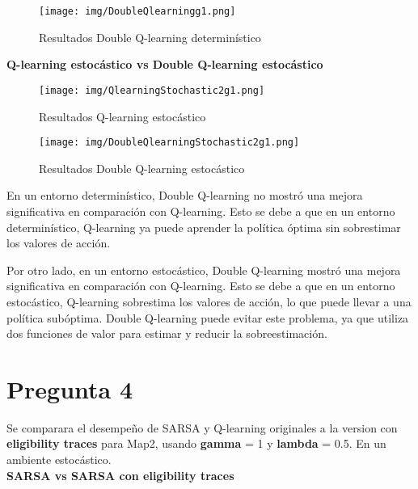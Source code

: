 \documentclass[
	spanish, %
	oneside
]{article}
\begin{document}
\begin{figure}[H]
	\centering
	\texttt{[image: img/DoubleQlearningg1.png]}
	\caption{Resultados Double Q-learning determinístico}
	\label{fig:map2_double_qlearning_modified}
\end{figure}

\newpage

\indent\textbf{Q-learning estocástico vs Double Q-learning estocástico}

\begin{figure}[H]
	\centering
	\texttt{[image: img/QlearningStochastic2g1.png]}
	\caption{Resultados Q-learning estocástico}
	\label{fig:map2_qlearning_stochastic2}
\end{figure}

\begin{figure}[H]
	\centering
	\texttt{[image: img/DoubleQlearningStochastic2g1.png]}
	\caption{Resultados Double Q-learning estocástico}
	\label{fig:map2_double_qlearning_stochastic}
\end{figure}

\newpage
\noindent En un entorno determinístico, Double Q-learning no mostró una mejora significativa en comparación con Q-learning. Esto se debe a que en un entorno determinístico, Q-learning ya puede aprender la política óptima sin sobrestimar los valores de acción. \\
\vspace*{12pt}

\noindent Por otro lado, en un entorno estocástico, Double Q-learning mostró una mejora significativa en comparación con Q-learning. Esto se debe a que en un entorno estocástico, Q-learning sobrestima los valores de acción, lo que puede llevar a una política subóptima. Double Q-learning puede evitar este problema, ya que utiliza dos funciones de valor para estimar y reducir la sobreestimación. \\

\newpage
\section*{Pregunta 4}

\noindent Se comparara el desempeño de SARSA y Q-learning originales a la version con \textbf{eligibility traces} para Map2, usando \textbf{gamma} = 1 y \textbf{lambda} = 0.5. En un ambiente estocástico. \\

\indent\textbf{SARSA vs SARSA con eligibility traces}
\end{document}
